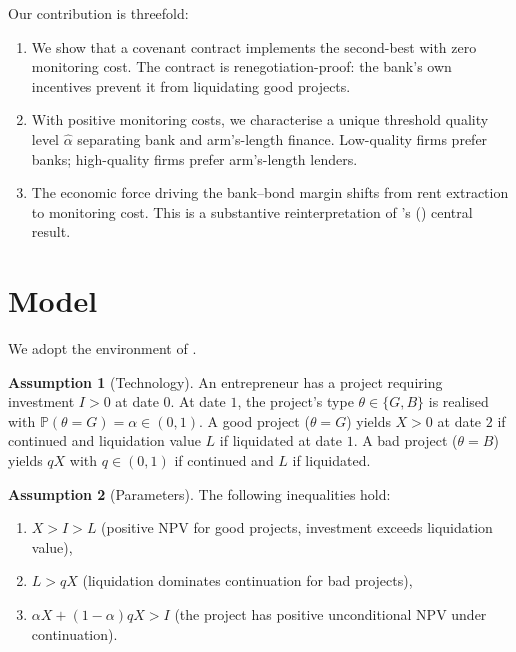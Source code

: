 \documentclass[12pt,a4paper]{article}
\theoremstyle{plain}
\theoremstyle{definition}
\newtheorem{assumption}{Assumption}
\theoremstyle{remark}
\newcommand{\Prob}{\mathbb{P}}
\begin{document}
Our contribution is threefold:

\begin{enumerate}[nosep]
\item We show that a covenant contract implements the second-best with zero monitoring cost. The contract is renegotiation-proof: the bank's own incentives prevent it from liquidating good projects.
\item With positive monitoring costs, we characterise a unique threshold quality level $\hat{\alpha}$ separating bank and arm's-length finance. Low-quality firms prefer banks; high-quality firms prefer arm's-length lenders.
\item The economic force driving the bank--bond margin shifts from rent extraction to monitoring cost. This is a substantive reinterpretation of \citeauthor{rajan1992}'s (\citeyear{rajan1992}) central result.
\end{enumerate}

\section{Model}

We adopt the environment of \citet{rajan1992}.

\begin{assumption}[Technology]\label{a:tech}
An entrepreneur has a project requiring investment $I>0$ at date $0$. At date $1$, the project's type $\theta \in \{G, B\}$ is realised with $\Prob(\theta = G) = \alpha \in (0,1)$. A good project ($\theta = G$) yields $X > 0$ at date $2$ if continued and liquidation value $L$ if liquidated at date $1$. A bad project ($\theta = B$) yields $qX$ with $q \in (0,1)$ if continued and $L$ if liquidated.
\end{assumption}

\begin{assumption}[Parameters]\label{a:param}
The following inequalities hold:
\begin{enumerate}[nosep,label=(\roman*)]
\item $X > I > L$ \quad (positive NPV for good projects, investment exceeds liquidation value),
\item $L > qX$ \quad (liquidation dominates continuation for bad projects),
\item $\alpha X + (1-\alpha)qX > I$ \quad (the project has positive unconditional NPV under continuation).
\end{enumerate}
\end{assumption}
\end{document}
